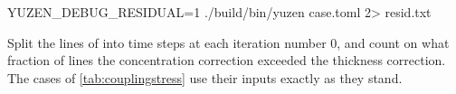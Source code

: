 \begin{shell}
YUZEN_DEBUG_RESIDUAL=1 ./build/bin/yuzen case.toml 2> resid.txt
\end{shell}

Split the  lines of  into time steps at each iteration number
0, and count on what fraction of lines the concentration correction exceeded
the thickness correction. The  cases of
\cref{tab:couplingstress} use their inputs exactly as they stand.
